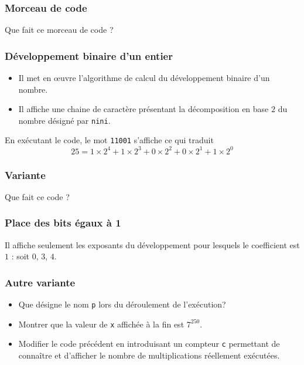 



\begin{frame}
  \frametitle{Morceau de code}
  Que fait ce morceau de code ?

\end{frame}

\begin{frame}
  \frametitle{Développement binaire d'un entier}
\begin{itemize}
  \item Il met en \oe{}uvre l'algorithme de calcul du développement binaire d'un nombre.
  \item Il affiche une chaine de caractère présentant la décomposition en base $2$ du nombre désigné par \texttt{nini}.
\end{itemize}
En exécutant le code, le mot \texttt{11001} s'affiche ce qui traduit
\begin{displaymath}
 25 =  1\times 2^4 + 1\times 2^3 + 0\times 2^2 + 0\times 2^1 + 1\times 2^0  
\end{displaymath}
\end{frame}

\begin{frame}
  \frametitle{Variante}
Que fait ce code ?

\end{frame}

\begin{frame}
  \frametitle{Place des bits égaux à 1}
Il affiche seulement les exposants du développement pour lesquels le coefficient est $1$ : soit $0$, $3$, $4$.
\end{frame}

\begin{frame}
  \frametitle{Autre variante}
  
\begin{itemize}
  \item Que désigne le nom \texttt{p} lors du déroulement de l'exécution?
  \item Montrer que la valeur de \texttt{x} affichée à la fin est $7^{250}$.
  \item Modifier le code précédent en introduisant un compteur \texttt{c} permettant de connaître et d'afficher le nombre de multiplications réellement exécutées.
\end{itemize}
\end{frame}

